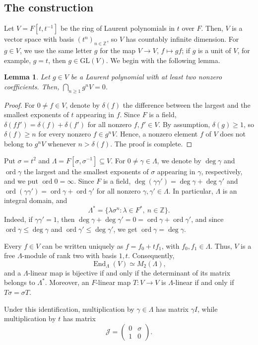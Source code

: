 \documentclass[11pt,reqno,a4paper]{amsart}
\numberwithin{equation}{section}
\newtheorem{lemma}[theorem]{Lemma}
\theoremstyle{definition}
\theoremstyle{plain}
\newcommand{\GL}{\mathrm{GL}}
\newcommand{\End}{\operatorname{End}}
\newcommand{\ord}{\operatorname{ord}}
\newcommand{\bbZ}{\mathbb Z}
\newcommand{\Jcal}{\mathcal J}
\begin{document}
\subsection{The construction}
Let $V=F[t,t^{-1}]$ be the ring of Laurent polynomials in $t$ over $F$. Then, $V$ is a vector space with basis $(t^n)_{n\in\bbZ}$, so $V$ has countably infinite dimension. For $g\in V$, we use the same letter $g$ for the map $V\to V$, $f\mapsto gf$; if $g$ is a unit of $V$, for example, $g=t$, then $g\in\GL(V)$. We begin with the following lemma.

\begin{lemma}
Let $g\in V$ be a Laurent polynomial with at least two nonzero coefficients. Then, $\bigcap_{n\ge1}g^nV=0$.
\end{lemma}
\begin{proof}
For $0\ne f\in V$, denote by $\delta(f)$ the difference between the largest and the smallest exponents of $t$ appearing in $f$. Since $F$ is a field, $\delta(ff')=\delta(f)+\delta(f')$ for all nonzero $f,f'\in V$. By assumption, $\delta(g)\ge1$, so $\delta(f)\ge n$ for every nonzero $f\in g^nV$. Hence, a nonzero element $f$ of $V$ does not belong to $g^nV$ whenever $n>\delta(f)$. The proof is complete.
\end{proof}

Put $\sigma=t^2$ and $\Lambda=F[\sigma,\sigma^{-1}]\subseteq V$. For $0\ne\gamma\in\Lambda$, we denote by $\deg\gamma$ and $\ord\gamma$ the largest and the smallest exponents of $\sigma$ appearing in $\gamma$, respectively, and we put $\ord0=\infty$. Since $F$ is a field, $\deg(\gamma\gamma')=\deg\gamma+\deg\gamma'$ and $\ord(\gamma\gamma')=\ord\gamma+\ord\gamma'$ for all nonzero $\gamma,\gamma'\in\Lambda$. In particular, $\Lambda$ is an integral domain, and
\[
\Lambda^*=\{\lambda\sigma^n:\lambda\in F^*,\ n\in\bbZ\}.
\]
Indeed, if $\gamma\gamma'=1$, then $\deg\gamma+\deg\gamma'=0=\ord\gamma+\ord\gamma'$, and since $\ord\gamma\le\deg\gamma$ and $\ord\gamma'\le\deg\gamma'$, we get $\ord\gamma=\deg\gamma$.

Every $f\in V$ can be written uniquely as $f=f_0+tf_1$, with $f_0,f_1\in\Lambda$. Thus, $V$ is a free $\Lambda$-module of rank two with basis $1,t$. Consequently,
\[
\End_{\Lambda}(V)\simeq M_2(\Lambda),
\]
and a $\Lambda$-linear map is bijective if and only if the determinant of its matrix belongs to $\Lambda^*$. Moreover, an $F$-linear map $T:V\to V$ is $\Lambda$-linear if and only if $T\sigma=\sigma T$.

Under this identification, multiplication by $\gamma\in\Lambda$ has matrix $\gamma I$, while multiplication by $t$ has matrix
\[
\Jcal=\begin{pmatrix}0&\sigma\\1&0\end{pmatrix}.
\]
\end{document}
